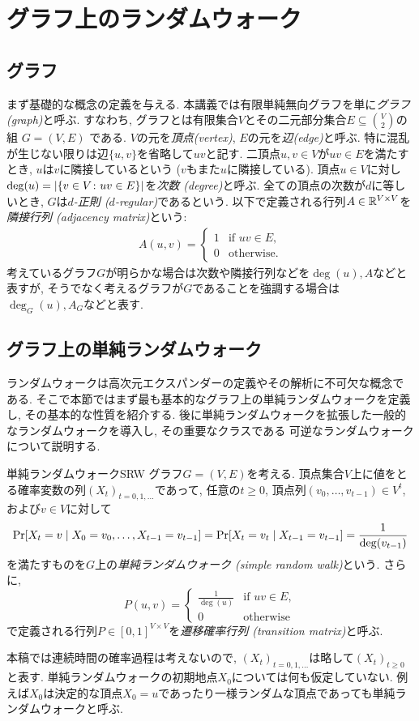 \section{グラフ上のランダムウォーク}
\subsection{グラフ}
まず基礎的な概念の定義を与える.
本講義では有限単純無向グラフを単に\emph{グラフ (graph)}と呼ぶ.
すなわち, グラフとは有限集合$V$とその二元部分集合$E\subseteq \binom{V}{2}$の組 $G = (V, E)$ である.
$V$の元を\emph{頂点(vertex)}, $E$の元を\emph{辺(edge)}と呼ぶ.
特に混乱が生じない限りは辺$\{u,v\}$を省略して$uv$と記す.
二頂点$u,v\in V$が$uv\in E$を満たすとき, $u$は$v$に隣接しているという ($v$もまた$u$に隣接している).
頂点$u\in V$に対し$\deg(u) = \lvert\lbrace v \in V \colon uv\in E\rbrace\rvert$を\emph{次数 (degree)}と呼ぶ.
全ての頂点の次数が$d$に等しいとき, $G$は\emph{$d$-正則 ($d$-regular)}であるという.
以下で定義される行列$A \in \mathbb{R}^{V\times V}$を\emph{隣接行列 (adjacency matrix)}という:
\begin{align*}
  A(u,v) = \begin{cases}
    1	& \text{if }uv\in E,\\
    0 & \text{otherwise}.
  \end{cases}
\end{align*}
考えているグラフ$G$が明らかな場合は次数や隣接行列などを$\deg(u),A$などと表すが,
  そうでなく考えるグラフが$G$であることを強調する場合は$\deg_G(u),A_G$などと表す.

\subsection{グラフ上の単純ランダムウォーク}
ランダムウォークは高次元エクスパンダーの定義やその解析に不可欠な概念である.
そこで本節ではまず最も基本的なグラフ上の単純ランダムウォークを定義し, その基本的な性質を紹介する.
後に単純ランダムウォークを拡張した一般的なランダムウォークを導入し, その重要なクラスである
可逆なランダムウォークについて説明する.
%
\begin{definition}{単純ランダムウォーク}{SRW}
  グラフ$G=(V,E)$を考える.
  頂点集合$V$上に値をとる確率変数の列$(X_t)_{t=0,1,\dots}$であって,
  任意の$t\ge 0$, 頂点列$(v_0,\dots,v_{t-1})\in V^t$, および$v\in V$に対して
  \[
    \Pr\sbra*{ X_t = v \condition X_0=v_0,\dots,X_{t-1} = v_{t-1} } = \Pr\sbra*{ X_t = v_t \condition X_{t-1} = v_{t-1}} = \frac{1}{\deg(v_{t-1})}
  \]
  を満たすものを$G$上の\emph{単純ランダムウォーク (simple random walk)}という.
  さらに,
  \[
    P(u,v) = \begin{cases}
      \frac{1}{\deg(u)}	& \text{if }uv\in E,\\
      0 & \text{otherwise}
    \end{cases}
  \]
  で定義される行列$P \in [0,1]^{V\times V}$を\emph{遷移確率行列 (transition matrix)}と呼ぶ.
\end{definition}
本稿では連続時間の確率過程は考えないので, $(X_t)_{t=0,1,\dots}$は略して$(X_t)_{t\ge 0}$と表す.
単純ランダムウォークの初期地点$X_0$については何も仮定していない.
例えば$X_0$は決定的な頂点$X_0=u$であったり一様ランダムな頂点であっても単純ランダムウォークと呼ぶ.

